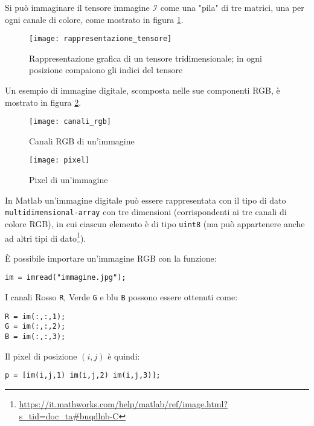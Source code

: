 Si può immaginare il tensore immagine $\mathcal{I}$ come una "pila" di tre matrici, una per ogni canale di colore, come mostrato in figura \ref{fig:rappresentazione_tensore}.

\begin{figure}[h]
\centering
\texttt{[image: rappresentazione\_tensore]}
\caption{Rappresentazione grafica di un tensore tridimensionale; in ogni posizione compaiono gli indici del tensore}
\label{fig:rappresentazione_tensore}
\end{figure}

Un esempio di immagine digitale, scomposta nelle sue componenti RGB, è mostrato in figura \ref{fig:canali_rgb}.

\begin{figure}[h]
  \begin{minipage}[b]{0.46\textwidth}
    \texttt{[image: canali\_rgb]}
    \caption{Canali RGB di un'immagine}
    \label{fig:canali_rgb}
  \end{minipage}
  \hfill
  \begin{minipage}[b]{0.46\textwidth}
    \texttt{[image: pixel]}
    \caption{Pixel di un'immagine}
  \end{minipage}
\end{figure}

In Matlab un'immagine digitale può essere rappresentata con il tipo di dato \verb|multidimensional-array| con tre dimensioni (corrispondenti ai tre canali di colore RGB), in cui ciascun elemento è di tipo \verb|uint8| (ma può appartenere anche ad altri tipi di dato\footnote{\url{https://it.mathworks.com/help/matlab/ref/image.html?s_tid=doc_ta#buqdlnb-C}}).

È possibile importare un'immagine RGB con la funzione:
\begin{verbatim}
im = imread("immagine.jpg");
\end{verbatim}
I canali Rosso \verb|R|, Verde \verb|G| e blu \verb|B| possono essere ottenuti come:
\begin{verbatim}
R = im(:,:,1);
G = im(:,:,2);
B = im(:,:,3);
\end{verbatim}
Il pixel di posizione $(i,j)$ è quindi:
\begin{verbatim}
p = [im(i,j,1) im(i,j,2) im(i,j,3)];
\end{verbatim}

